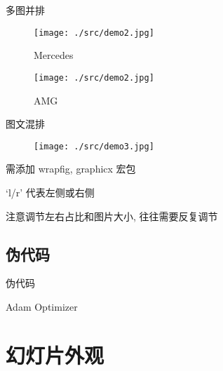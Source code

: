 \documentclass[aspectratio=169]{beamer}  %
\begin{document}
\begin{frame}{多图并排}
    \begin{figure}[htbp]
        \centering
        \begin{minipage}[t]{0.48\textwidth}
            \centering
            \texttt{[image: ./src/demo2.jpg]}
            \caption{Mercedes}
        \end{minipage}
        \begin{minipage}[t]{0.48\textwidth}
            \centering
            \texttt{[image: ./src/demo2.jpg]}
            \caption{AMG}
        \end{minipage}
    \end{figure}
\end{frame}

\begin{frame}{图文混排}
    \begin{wrapfigure}{l}{0.6\textwidth}
        \centering
        \texttt{[image: ./src/demo3.jpg]}
    \end{wrapfigure}
    需添加 wrapfig, graphicx 宏包
    
    `l/r' 代表左侧或右侧

    注意调节左右占比和图片大小, 往往需要反复调节

\end{frame}

\subsection{伪代码}
\begin{frame}{伪代码}
    \begin{algorithm}[H]  %
    \caption{Adam Optimizer} 
    \label{alg1}
    \begin{algorithmic}
        \ENDWHILE
    \end{algorithmic}
    \end{algorithm}
\end{frame}

\section{幻灯片外观}
\end{document}
